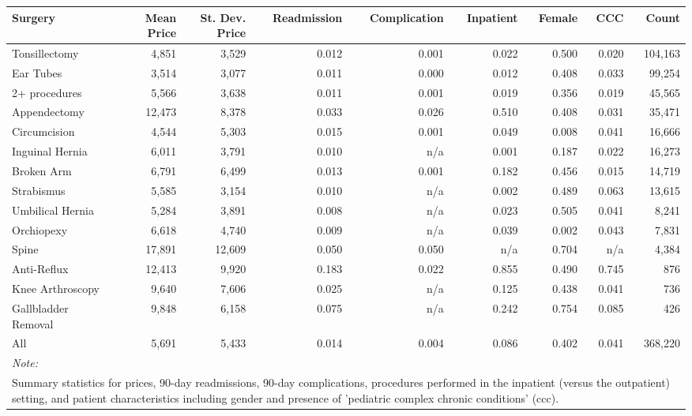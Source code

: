 \begin{table}[H]
\centering
\begin{tabular}{lrrrrrrrr}
\toprule
Surgery & Mean Price & St. Dev. Price & Readmission & Complication & Inpatient & Female & CCC & Count\\
\midrule
Tonsillectomy & 4,851 & 3,529 & 0.012 & 0.001 & 0.022 & 0.500 & 0.020 & 104,163\\
Ear Tubes & 3,514 & 3,077 & 0.011 & 0.000 & 0.012 & 0.408 & 0.033 & 99,254\\
2+ procedures & 5,566 & 3,638 & 0.011 & 0.001 & 0.019 & 0.356 & 0.019 & 45,565\\
Appendectomy & 12,473 & 8,378 & 0.033 & 0.026 & 0.510 & 0.408 & 0.031 & 35,471\\
Circumcision & 4,544 & 5,303 & 0.015 & 0.001 & 0.049 & 0.008 & 0.041 & 16,666\\
\addlinespace
Inguinal Hernia & 6,011 & 3,791 & 0.010 & n/a & 0.001 & 0.187 & 0.022 & 16,273\\
Broken Arm & 6,791 & 6,499 & 0.013 & 0.001 & 0.182 & 0.456 & 0.015 & 14,719\\
Strabismus & 5,585 & 3,154 & 0.010 & n/a & 0.002 & 0.489 & 0.063 & 13,615\\
Umbilical Hernia & 5,284 & 3,891 & 0.008 & n/a & 0.023 & 0.505 & 0.041 & 8,241\\
Orchiopexy & 6,618 & 4,740 & 0.009 & n/a & 0.039 & 0.002 & 0.043 & 7,831\\
\addlinespace
Spine & 17,891 & 12,609 & 0.050 & 0.050 & n/a & 0.704 & n/a & 4,384\\
Anti-Reflux & 12,413 & 9,920 & 0.183 & 0.022 & 0.855 & 0.490 & 0.745 & 876\\
Knee Arthroscopy & 9,640 & 7,606 & 0.025 & n/a & 0.125 & 0.438 & 0.041 & 736\\
Gallbladder Removal & 9,848 & 6,158 & 0.075 & n/a & 0.242 & 0.754 & 0.085 & 426\\
All & 5,691 & 5,433 & 0.014 & 0.004 & 0.086 & 0.402 & 0.041 & 368,220\\
\bottomrule
\multicolumn{9}{l}{\rule{0pt}{1em}\textit{Note: }}\\
\multicolumn{9}{l}{\rule{0pt}{1em}Summary statistics for prices, 90-day readmissions, 90-day complications, procedures performed in the inpatient (versus the outpatient) setting, and patient characteristics including gender and presence of 'pediatric complex chronic conditions' (ccc).}\\
\end{tabular}
\end{table}
